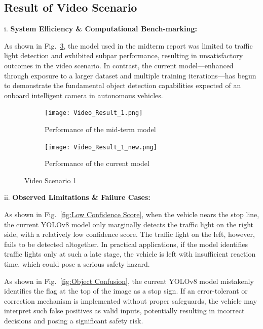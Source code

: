 \documentclass[journal,transmag]{IEEEtran}
\begin{document}
\subsection{Result of Video Scenario}

i. \textbf{System Efficiency \& Computational Bench-marking:}

As shown in Fig.~\ref{fig:Video Scenario 1}, the model used in the midterm report was limited to traffic light detection and exhibited subpar performance, resulting in unsatisfactory outcomes in the video scenario. In contrast, the current model—enhanced through exposure to a larger dataset and multiple training iterations—has begun to demonstrate the fundamental object detection capabilities expected of an onboard intelligent camera in autonomous vehicles.

\begin{figure}[h]
    \centering
    \begin{subfigure}[b]{0.225\textwidth}
        \texttt{[image: Video\_Result\_1.png]}
        \caption{Performance of the mid-term model}
        \label{fig:Video_Result_1}
    \end{subfigure}
    \hfill
    \begin{subfigure}[b]{0.225\textwidth}
        \texttt{[image: Video\_Result\_1\_new.png]}
        \caption{Performance of the current model
}
        \label{fig:Video_Result_1_new}
    \end{subfigure}
    \caption{Video Scenario 1}
    \label{fig:Video Scenario 1}
\end{figure}

ii. \textbf{Observed Limitations \& Failure Cases:}

As shown in Fig.~\ref{fig:Low Confidence Score}, when the vehicle nears the stop line, the current YOLOv8 model only marginally detects the traffic light on the right side, with a relatively low confidence score. The traffic light on the left, however, fails to be detected altogether. In practical applications, if the model identifies traffic lights only at such a late stage, the vehicle is left with insufficient reaction time, which could pose a serious safety hazard.

As shown in Fig.~\ref{fig:Object Confusion}, the current YOLOv8 model mistakenly identifies the flag at the top of the image as a stop sign. If an error-tolerant or correction mechanism is implemented without proper safeguards, the vehicle may interpret such false positives as valid inputs, potentially resulting in incorrect decisions and posing a significant safety risk.
\end{document}
